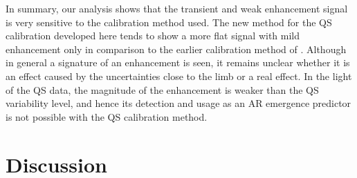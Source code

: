 \documentclass{aa}
\begin{document}
In summary, our analysis shows that the transient
and weak enhancement signal is very sensitive to the calibration
method used. The new method for the QS calibration developed here tends to show a more flat signal with mild enhancement only in comparison to the earlier calibration method of \cite{SRB16}. Although in general a signature of an enhancement is seen, it remains unclear whether it is an effect caused by the uncertainties close to the limb or a real effect. In the light of the QS data, the magnitude of the enhancement is weaker than the QS variability level, and hence its detection and usage as an AR emergence predictor is not possible with the QS calibration method.




\section{Discussion}
\end{document}
